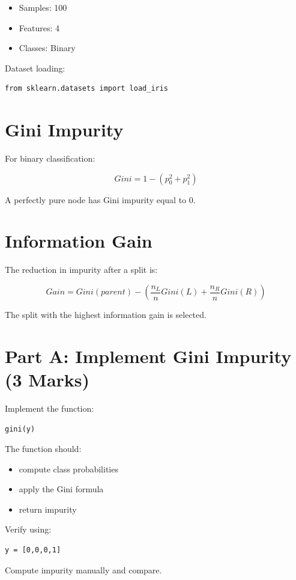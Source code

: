\documentclass[12pt,a4paper]{article}
\begin{document}
\begin{itemize}
\item Samples: 100
\item Features: 4
\item Classes: Binary
\end{itemize}

Dataset loading:

\begin{verbatim}
from sklearn.datasets import load_iris
\end{verbatim}

\section{Gini Impurity}

For binary classification:

\[
Gini = 1 - (p_0^2 + p_1^2)
\]

A perfectly pure node has Gini impurity equal to 0.

\section{Information Gain}

The reduction in impurity after a split is:

\[
Gain =
Gini(parent) -
\left(
\frac{n_L}{n}Gini(L)
+
\frac{n_R}{n}Gini(R)
\right)
\]

The split with the highest information gain is selected.


\section{Part A: Implement Gini Impurity (3 Marks)}

\begin{tcolorbox}

Implement the function:

\begin{verbatim}
gini(y)
\end{verbatim}

The function should:

\begin{itemize}
\item compute class probabilities
\item apply the Gini formula
\item return impurity
\end{itemize}

Verify using:

\begin{verbatim}
y = [0,0,0,1]
\end{verbatim}

Compute impurity manually and compare.

\vspace{5cm}

\end{tcolorbox}
\end{document}
